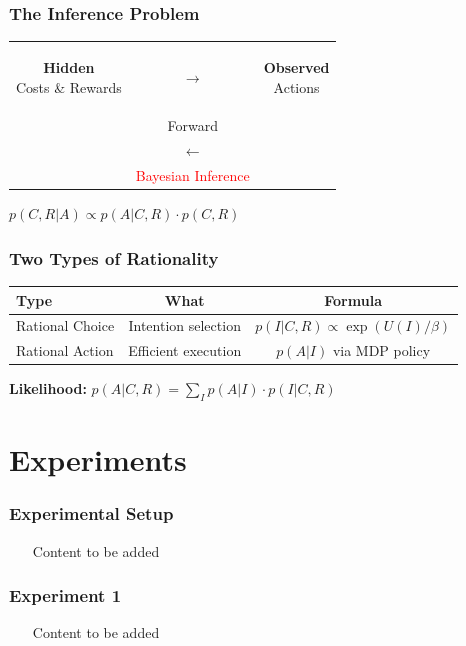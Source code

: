 \documentclass{beamer}
\begin{document}
\begin{frame}
\frametitle{The Inference Problem}
\begin{center}
\begin{tabular}{c c c}
\colorbox{blue!20}{\parbox{2.5cm}{\centering \textbf{Hidden} \\ Costs \& Rewards}} 
& $\longrightarrow$ & 
\colorbox{red!20}{\parbox{2.5cm}{\centering \textbf{Observed} \\ Actions}} \\
& Forward & \\
& $\longleftarrow$ & \\
& \textcolor{red}{Bayesian Inference} & \\
\end{tabular}

\vspace{0.8cm}
$p(C,R|A) \propto p(A|C,R) \cdot p(C,R)$
\end{center}
\end{frame}

\begin{frame}
\frametitle{Two Types of Rationality}
\begin{center}
\begin{tabular}{|l|c|c|}
\hline
\textbf{Type} & \textbf{What} & \textbf{Formula} \\
\hline
Rational Choice & Intention selection & $p(I|C,R) \propto \exp(U(I)/\beta)$ \\
\hline
Rational Action & Efficient execution & $p(A|I)$ via MDP policy \\
\hline
\end{tabular}

\vspace{0.8cm}
\textbf{Likelihood:} $p(A|C,R) = \sum_I p(A|I) \cdot p(I|C,R)$
\end{center}
\end{frame}

\section{Experiments}
\begin{frame}
\frametitle{Experimental Setup}
\begin{itemize}
    \item [Content to be added]
\end{itemize}
\end{frame}

\begin{frame}
\frametitle{Experiment 1}
\begin{itemize}
    \item [Content to be added]
\end{itemize}
\end{frame}
\end{document}

